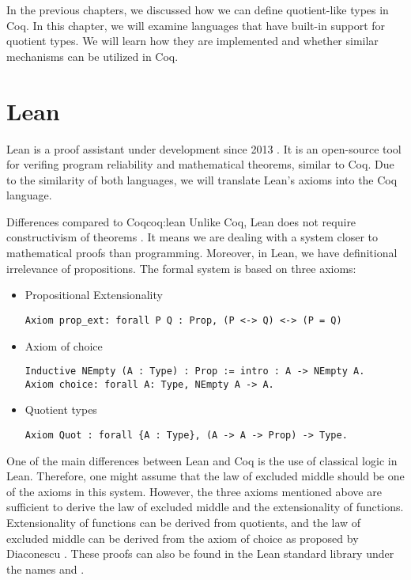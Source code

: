 In the previous chapters, we discussed how we can define quotient-like types in Coq. In this chapter, we will examine languages that have built-in support for quotient types. We will learn how they are implemented and whether similar mechanisms can be utilized in Coq.
\section{Lean}
Lean is a proof assistant under development since 2013 \cite{lean4}. It is an open-source tool for verifing program reliability and mathematical theorems, similar to Coq. Due to the similarity of both languages, we will translate Lean's axioms into the Coq language.
\begin{coq}{Differences compared to Coq}{coq:lean}
Unlike Coq, Lean does not require constructivism of theorems \cite{lean4}. It means we are dealing with a system closer to mathematical proofs than programming. Moreover, in Lean, we have definitional irrelevance of propositions. The formal system is based on three axioms:
\begin{itemize}
    \item{Propositional Extensionality}
\begin{verbatim}
Axiom prop_ext: forall P Q : Prop, (P <-> Q) <-> (P = Q)
\end{verbatim}
    \item{Axiom of choice}
\begin{verbatim}
Inductive NEmpty (A : Type) : Prop := intro : A -> NEmpty A.
Axiom choice: forall A: Type, NEmpty A -> A.
\end{verbatim}
    \item{Quotient types}
\begin{verbatim}
Axiom Quot : forall {A : Type}, (A -> A -> Prop) -> Type.
\end{verbatim}
\end{itemize}
One of the main differences between Lean and Coq is the use of classical logic in Lean. Therefore, one might assume that the law of excluded middle should be one of the axioms in this system. However, the three axioms mentioned above are sufficient to derive the law of excluded middle and the extensionality of functions. Extensionality of functions can be derived from quotients, and the law of excluded middle can be derived from the axiom of choice as proposed by Diaconescu \cite{choise}. These proofs can also be found in the Lean standard library under the names  and .
\end{coq}
